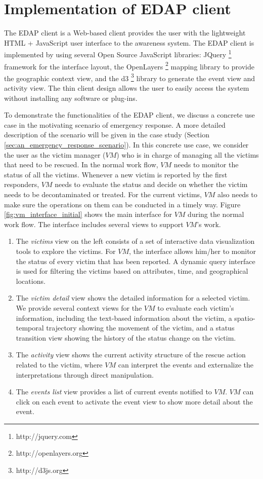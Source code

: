 \section{Implementation of EDAP client} %
\label{sec:implementation_of_edap_client}
The EDAP client is a Web-based client provides the user with the lightweight HTML + JavaScript user interface to the awareness system. The EDAP client is implemented by using several Open Source JavaScript libraries: JQuery \footnote{http://jquery.com} framework for the interface layout, the OpenLayers \footnote{http://openlayers.org} mapping library to provide the geographic context view, and the d3 \footnote{http://d3js.org} library to generate the event view and activity view. The thin client design allows the user to easily access the system without installing any software or plug-ins. 

To demonstrate the functionalities of the EDAP client, we discuss a concrete use case in the motivating scenario of emergency response. A more detailed description of the scenario will be given in the case study (Section \ref{sec:an_emergency_response_scenario}). In this concrete use case, we consider the user as the victim manager ($VM$) who is in charge of managing all the victims that need to be rescued. In the normal work flow, $VM$ needs to monitor the status of all the victims. Whenever a new victim is reported by the first responders, $VM$ needs to evaluate the status and decide on whether the victim needs to be decontaminated or treated. For the current victims, $VM$ also needs to make sure the operations on them can be conducted in a timely way. Figure \ref{fig:vm_interface_initial} shows the main interface for $VM$ during the normal work flow. The interface includes several views to support $VM$'s work. 

\begin{enumerate}
	\item The \emph{victims} view on the left consists of a set of interactive data visualization tools to explore the victims. For $VM$, the interface allows him/her to monitor the status of every victim that has been reported. A dynamic query interface is used for filtering the victims based on attributes, time, and geographical locations.
	\item The \emph{victim detail} view shows the detailed information for a selected victim. We provide several context views for the $VM$ to evaluate each victim's information, including the text-based information about the victim, a spatio-temporal trajectory showing the movement of the victim, and a status transition view showing the history of the status change on the victim.
	\item The \emph{activity} view shows the current activity structure of the rescue action related to the victim, where $VM$ can interpret the events and externalize the interpretations through direct manipulation.
	\item The \emph{events list} view provides a list of current events notified to $VM$. $VM$ can click on each event to activate the event view to show more detail about the event.
\end{enumerate}

